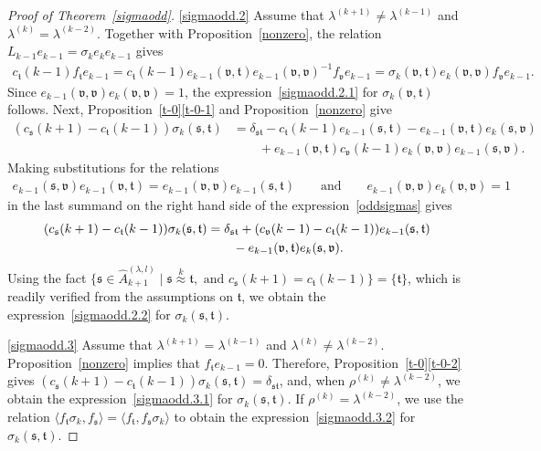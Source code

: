 \documentclass[11pt,a4paper,reqno,svgnames]{amsart}
\theoremstyle{plain}
\theoremstyle{definition}
\numberwithin{equation}{section}
\begin{document}
\begin{proof}[Proof of Theorem~\ref{sigmaodd}]
\eqref{sigmaodd.2} Assume that  $\lambda^{(k+1)}\ne \lambda^{(k-1)}$ and $\lambda^{(k)}=\lambda^{(k-2)}$. Together with Proposition~\ref{nonzero}, the relation $L_{k-1}e_{k-1}=\sigma_ke_ke_{k-1}$ gives
\begin{align*}
c_\mathfrak{t}(k-1)f_\mathfrak{t}e_{k-1}=c_\mathfrak{t}(k-1)e_{k-1}(\mathfrak{v,t})e_{k-1}(\mathfrak{v,v})^{-1}f_\mathfrak{v}e_{k-1}=\sigma_k(\mathfrak{v,t})e_k(\mathfrak{v,v})f_\mathfrak{v}e_{k-1}. 
\end{align*}
Since $e_{k-1}(\mathfrak{v,v})e_k(\mathfrak{v,v})=1$, the expression~\eqref{sigmaodd.2.1} for $\sigma_k(\mathfrak{v,t})$ follows.  Next, Proposition~\ref{t-0}\eqref{t-0-1} and Proposition~\ref{nonzero} give
\begin{equation}\label{oddsigmas}
\begin{split}
(c_\mathfrak{s}(k+1)-c_\mathfrak{t}(k-1))\sigma_k(\mathfrak{s,t})&=\delta_\mathfrak{st}-c_\mathfrak{t}(k-1)e_{k-1}(\mathfrak{s,t})-e_{k-1}(\mathfrak{v,t}) e_k(\mathfrak{s,v})\\
&\qquad+e_{k-1}(\mathfrak{v,t})c_\mathfrak{v}(k-1)e_k(\mathfrak{v,v})e_{k-1}(\mathfrak{s,v}).
\end{split}
\end{equation}
Making substitutions for the relations 
\begin{align*}
e_{k-1}(\mathfrak{s,v}) e_{k-1}(\mathfrak{v,t})= e_{k-1}(\mathfrak{v,v})e_{k-1}(\mathfrak{s,t})\qquad\text{and}\qquad e_{k-1}(\mathfrak{v,v}) e_k(\mathfrak{v,v})=1
\end{align*}
in the last summand on the right hand side of the expression~\eqref{oddsigmas} gives 
\begin{equation}
\begin{split}\notag
(c_\mathfrak{s}(k+1)-c_\mathfrak{t}(k-1))\sigma_k(\mathfrak{s,t})&=\delta_\mathfrak{st}+(c_\mathfrak{v}(k-1)-c_\mathfrak{t}(k-1))e_{k-1}(\mathfrak{s,t})\\
&\qquad-e_{k-1}(\mathfrak{v,t}) e_k(\mathfrak{s,v}).
\end{split}
\end{equation}
Using the fact $\big\lbrace \mathfrak{s} \in\hat{A}_{k+1}^{(\lambda,l)}\mid  \mathfrak{s}\stackrel{k}{\approx}\mathfrak{t},\text{ and }c_\mathfrak{s}(k+1)=c_\mathfrak{t}(k-1)\big\rbrace=\big\lbrace \mathfrak{t}\big\rbrace$, which is readily verified from the assumptions on $\mathfrak{t}$, we obtain the expression~\eqref{sigmaodd.2.2} for $\sigma_k(\mathfrak{s,t})$.

\eqref{sigmaodd.3} Assume that  $\lambda^{(k+1)}=\lambda^{(k-1)}$ and $\lambda^{(k)}\ne\lambda^{(k-2)}$. Proposition~\ref{nonzero} implies that $f_\mathfrak{t}e_{k-1}=0$. Therefore, Proposition~\ref{t-0}\eqref{t-0-2} gives $(c_\mathfrak{s}(k+1)-c_\mathfrak{t}(k-1))\sigma_k(\mathfrak{s,t})=\delta_\mathfrak{st}$, and, when $\rho^{(k)}\ne\lambda^{(k-2)}$, we obtain the expression~\eqref{sigmaodd.3.1} for $\sigma_k(\mathfrak{s,t})$. If $\rho^{(k)}=\lambda^{(k-2)}$, we use the relation $\langle f_\mathfrak{t}\sigma_k,f_\mathfrak{s}\rangle = \langle f_\mathfrak{t},f_\mathfrak{s}\sigma_k\rangle$ to obtain the expression~\eqref{sigmaodd.3.2} for $\sigma_k(\mathfrak{s,t})$. 


\end{proof}
\end{document}
